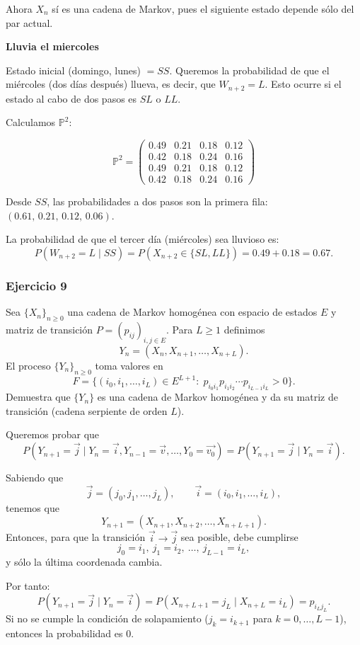 Ahora $X_n$ sí es una cadena de Markov, pues el siguiente estado depende sólo del par actual.

\textbf{Lluvia el miercoles}

Estado inicial (domingo, lunes) $=SS$.  
Queremos la probabilidad de que el miércoles (dos días después) llueva, es decir, que $W_{n+2}=L$.  
Esto ocurre si el estado al cabo de dos pasos es $SL$ o $LL$.

Calculamos $\mathbb{P}^2$:

\[
\mathbb{P}^2=
\begin{pmatrix}
0.49 & 0.21 & 0.18 & 0.12\\
0.42 & 0.18 & 0.24 & 0.16\\
0.49 & 0.21 & 0.18 & 0.12\\
0.42 & 0.18 & 0.24 & 0.16
\end{pmatrix}
\]

Desde $SS$, las probabilidades a dos pasos son la primera fila: $(0.61,\,0.21,\,0.12,\,0.06)$.

La probabilidad de que el tercer día (miércoles) sea lluvioso es:
\[
P(W_{n+2}=L \mid SS)=P(X_{n+2}\in\{SL,LL\})=0.49+0.18=0.67.
\]


\subsubsection{Ejercicio 9}
\begin{exercise}
Sea $\{X_n\}_{n\ge0}$ una cadena de Markov homogénea con espacio de estados $E$ y matriz de transición $P=(p_{ij})_{i,j\in E}$. Para $L\ge1$ definimos
\[
Y_n=(X_n,X_{n+1},\dots,X_{n+L}).
\]
El proceso $\{Y_n\}_{n\ge0}$ toma valores en
\[
F=\{(i_0,i_1,\dots,i_L)\in E^{L+1}:\; p_{i_0 i_1}p_{i_1 i_2}\cdots p_{i_{L-1} i_L}>0\}.
\]
Demuestra que $\{Y_n\}$ es una cadena de Markov homogénea y da su matriz de transición (cadena serpiente de orden $L$).
\end{exercise}

Queremos probar que
\[
P(Y_{n+1}=\vec{j} \mid Y_n=\vec{i}, Y_{n-1}=\vec{v},\dots,Y_0=\vec{v_0})
= P(Y_{n+1}=\vec{j} \mid Y_n=\vec{i}).
\]

Sabiendo que
\[
\vec{j}=(j_0,j_1,\dots,j_L), \qquad \vec{i}=(i_0,i_1,\dots,i_L),
\]
tenemos que
\[
Y_{n+1}=(X_{n+1},X_{n+2},\dots,X_{n+L+1}).
\]
Entonces, para que la transición $\vec{i}\to\vec{j}$ sea posible, debe cumplirse
\[
j_0=i_1,\ j_1=i_2,\ \dots,\ j_{L-1}=i_L,
\]
y sólo la última coordenada cambia.

Por tanto:
\[
P(Y_{n+1}=\vec{j} \mid Y_n=\vec{i})
= P(X_{n+L+1}=j_L \mid X_{n+L}=i_L)
= p_{i_L j_L}.
\]
Si no se cumple la condición de solapamiento ($j_k=i_{k+1}$ para $k=0,\dots,L-1$), entonces la probabilidad es 0.


